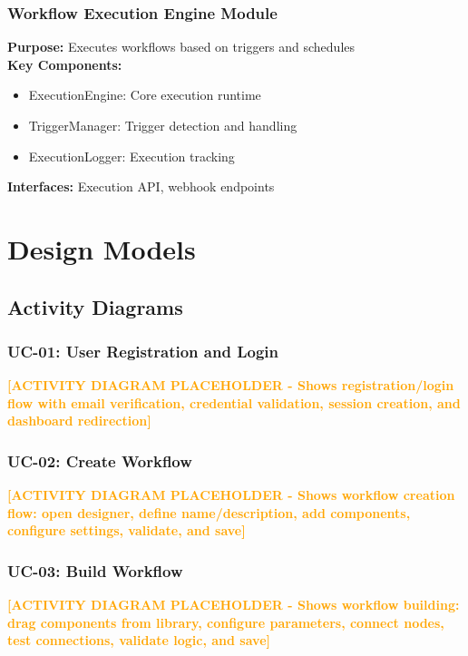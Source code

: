 \documentclass[12pt,a4paper]{article}
\begin{document}
\subsubsection{Workflow Execution Engine Module}
\textbf{Purpose:} Executes workflows based on triggers and schedules\\
\textbf{Key Components:}
\begin{itemize}
    \item ExecutionEngine: Core execution runtime
    \item TriggerManager: Trigger detection and handling
    \item ExecutionLogger: Execution tracking
\end{itemize}
\textbf{Interfaces:} Execution API, webhook endpoints

\newpage

\section{Design Models}

\subsection{Activity Diagrams}

\subsubsection{UC-01: User Registration and Login}

\textcolor{orange}{\textbf{[ACTIVITY DIAGRAM PLACEHOLDER - Shows registration/login flow with email verification, credential validation, session creation, and dashboard redirection]}}

\subsubsection{UC-02: Create Workflow}

\textcolor{orange}{\textbf{[ACTIVITY DIAGRAM PLACEHOLDER - Shows workflow creation flow: open designer, define name/description, add components, configure settings, validate, and save]}}

\subsubsection{UC-03: Build Workflow}

\textcolor{orange}{\textbf{[ACTIVITY DIAGRAM PLACEHOLDER - Shows workflow building: drag components from library, configure parameters, connect nodes, test connections, validate logic, and save]}}
\end{document}
